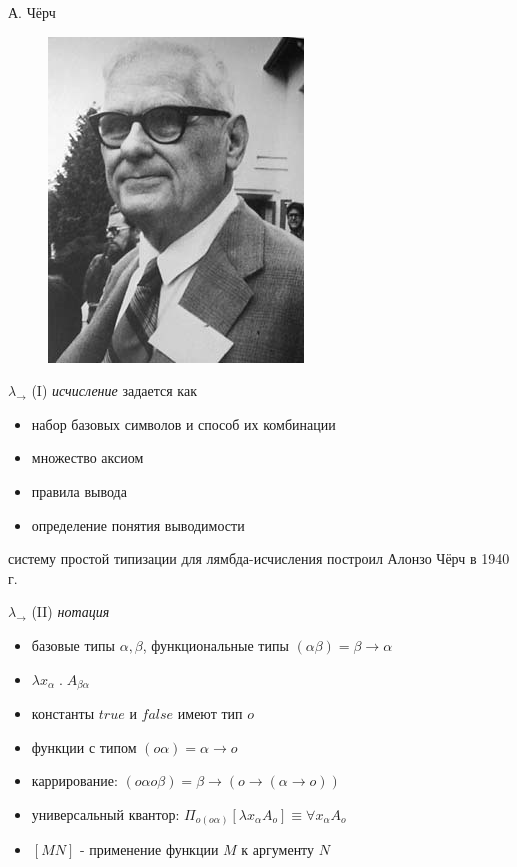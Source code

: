 \documentclass{beamer}
\begin{document}
\begin{frame}{А. Чёрч}
\begin{center}
	\begin{figure}[H]
		\includegraphics[scale=0.6]{church.jpg} 
	\end{figure}
\end{center}
\end{frame}

\begin{frame}{$\lambda_\to$ (I)}
\textit{исчисление} задается как\\
\begin{itemize}
  \item набор базовых символов и способ их комбинации
  \item множество аксиом
  \item правила вывода
  \item определение понятия выводимости
\end{itemize}
\bigskip
систему простой типизации для лямбда-исчисления построил Алонзо Чёрч в 1940 г.
\end{frame}

\begin{frame}{$\lambda_\to$ (II)}
\textit{нотация}\\
\medskip
\begin{itemize}
  \item базовые типы $\alpha, \beta$, функциональные типы $(\alpha\beta) = \beta \to \alpha$
  \item $\lambda x_\alpha \; . \; A_{\beta\alpha}$
  \item константы $true$ и $false$ имеют тип $o$
  \item функции с типом $(o\alpha) = \alpha \to o$
  \item каррирование: $(o\alpha o\beta) = \beta \to (o \to (\alpha \to o))$
  \item универсальный квантор: $\Pi_{o(o\alpha)}[\lambda x_\alpha A_o] \equiv \forall x_\alpha A_o$
  \item $[MN]$ - применение функции $M$ к аргументу $N$
\end{itemize}
\end{frame}
\end{document}
